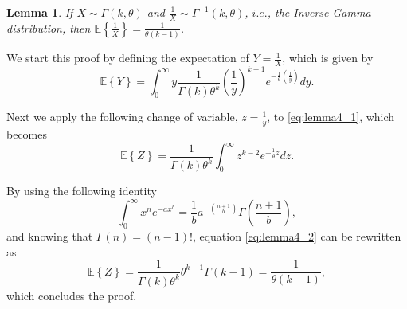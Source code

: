 \documentclass[10pt,journal,comsoc,final]{IEEEtran}
\newtheorem{lemma}{Lemma}
\begin{document}
\begin{lemma} If $X \sim \Gamma(k,\theta)$ and $\frac{1}{X} \sim \Gamma^{-1}(k,\theta)$, $i.e.$, the Inverse-Gamma distribution, then $\mathbb{E} \left\lbrace \frac{1}{X} \right\rbrace = \frac{1}{\theta(k-1)}$.
\end{lemma}
\begin{IEEEproof} We start this proof by defining the expectation of $Y = \frac{1}{X}$, which is given by
\begin{equation}\label{eq:lemma4_1}
\mathbb{E} \left\lbrace Y \right\rbrace = \int_{0}^{\infty}y \frac{1}{\Gamma(k) \theta^{k}} \left( \frac{1}{y} \right)^{k + 1} e^{-\frac{1}{\theta} \left( \frac{1}{y} \right) } dy.
\end{equation}

Next we apply the following change of variable, $z = \frac{1}{y}$, to \eqref{eq:lemma4_1}, which becomes
\begin{equation}\label{eq:lemma4_2}
\mathbb{E} \left\lbrace Z \right\rbrace =  \frac{1}{\Gamma(k) \theta^{k}} \int_{0}^{\infty} z^{k-2}e^{-\frac{1}{\theta} z } dz.
\end{equation}

By using the following identity 
\begin{equation}\label{eq:lemma4_3}
\int_{0}^{\infty} x^{n} e^{-ax^{b}} = \frac{1}{b} a^{-\left( \frac{n+1}{b} \right)} \Gamma \left( \frac{n+1}{b} \right),
\end{equation}
and knowing that $\Gamma(n) = (n-1)!$, equation \eqref{eq:lemma4_2} can be rewritten as 
\begin{equation}\label{eq:lemma4_4}
\mathbb{E} \left\lbrace Z \right\rbrace = \frac{1}{\Gamma(k) \theta^{k}} \theta^{k-1} \Gamma(k-1) = \frac{1}{\theta (k-1)},
\end{equation}
which concludes the proof.
\end{IEEEproof}
\end{document}
